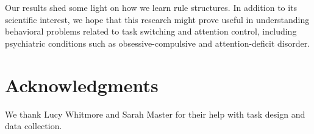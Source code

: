 \documentclass[10pt, letterpaper]{article}
\begin{document}
Our results shed some light on how we learn rule structures. In addition to its scientific interest, we hope that this research might prove useful in understanding behavioral problems related to task switching and attention control, including psychiatric conditions such as obsessive-compulsive and attention-deficit disorder.





\section{Acknowledgments}

We thank Lucy Whitmore and Sarah Master for their help with task design and data collection. 




\setlength{\bibleftmargin}{.125in}
\setlength{\bibindent}{-\bibleftmargin}


\end{document}
